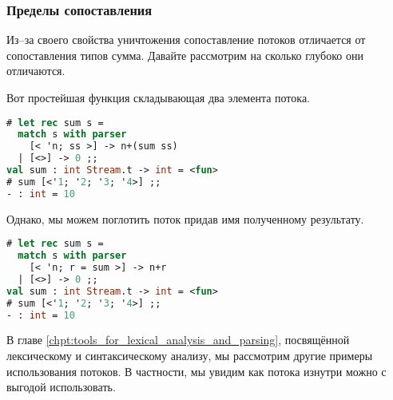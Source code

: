 \subsubsection{Пределы сопоставления}

Из--за своего свойства уничтожения сопоставление потоков отличается от
сопоставления типов сумма. Давайте рассмотрим на сколько глубоко они отличаются.

Вот простейшая функция складывающая два элемента потока.

\begin{lstlisting}[language=OCaml]
# let rec sum s =
  match s with parser
    [< 'n; ss >] -> n+(sum ss)
  | [<>] -> 0 ;;
val sum : int Stream.t -> int = <fun>
# sum [<'1; '2; '3; '4>] ;;
- : int = 10
\end{lstlisting}

Однако, мы можем поглотить поток  придав имя полученному
результату.

\begin{lstlisting}[language=OCaml]
# let rec sum s =
  match s with parser
    [< 'n; r = sum >] -> n+r
  | [<>] -> 0 ;;
val sum : int Stream.t -> int = <fun>
# sum [<'1; '2; '3; '4>] ;;
- : int = 10
\end{lstlisting}

В главе \ref{chpt:tools_for_lexical_analysis_and_parsing}, посвящённой
лексическому и синтаксическому анализу, мы рассмотрим другие примеры
использования потоков. В частности, мы увидим как  потока
изнутри можно с выгодой использовать.